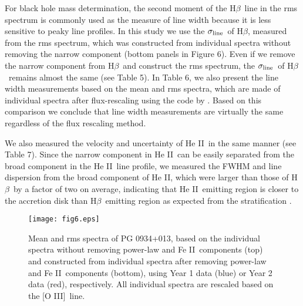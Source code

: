 \documentclass[iop]{emulateapj}
\newcommand{\Hb}{\rm H{$\beta$}}
\newcommand{\OIII}{[O {\small III}]}
\newcommand{\FeII}{Fe {\small II}}
\newcommand{\HeII}{He {\small II}}
\newcommand{\sigmaline}{$\sigma_{\rm line}$}
\begin{document}
For black hole mass determination, the second moment of the \Hb\ line in the rms spectrum is commonly used as the measure of line width because it is less sensitive to peaky line profiles. In this study we use the \sigmaline\ of \Hb, measured from the rms spectrum, which was constructed
from individual spectra without removing the narrow component (bottom panels in Figure 6). Even if we remove the narrow component from \Hb\ and construct the rms spectrum, the \sigmaline\ of \Hb\ remains almost the same (see Table 5). 
In Table 6, we also present the line width measurements based on the mean and rms spectra, which are made of individual spectra after
flux-rescaling using the code by \citet{Fausnaugh2016}. Based on this comparison we conclude that line width measurements are virtually the same regardless of the flux rescaling method. 


We also measured the velocity and uncertainty of \HeII\ in the same manner (see Table 7).
Since the narrow component in \HeII\ can be easily separated from the broad component in the \HeII\ line profile,
we measured the FWHM and line dispersion from the broad component of \HeII, 
which were larger than those of \Hb\ by a factor of two on average, 
indicating that \HeII\ emitting region is closer to the accretion disk than \Hb\ emitting region as expected from the stratification \citep{Wandel1997,PetersonWandel2000}. 



\begin{figure}
	\texttt{[image: fig6.eps]}
	\caption{Mean and rms spectra of PG 0934+013, based on the individual spectra without removing power-law and \FeII\ components (top)
and constructed from individual spectra after removing power-law and \FeII\ components (bottom), using Year 1 data (blue) or Year 2 data (red), 
respectively. All individual spectra are rescaled based on the \OIII\ line.
		\label{fig5}}
\end{figure} 
\end{document}
